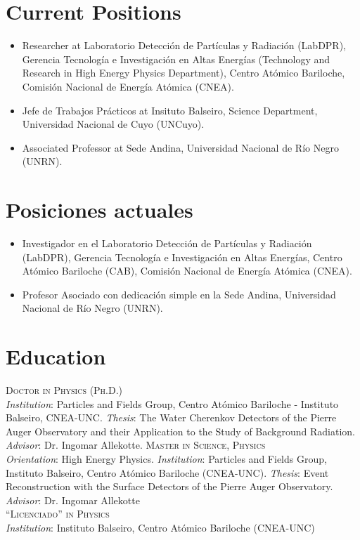 \ifeng
\section*{Current Positions}
\begin{itemize}
  \item Researcher at Laboratorio Detección de Partículas y Radiación (LabDPR), Gerencia Tecnología e Investigación en Altas Energías (Technology and Research in High Energy Physics Department), Centro Atómico Bariloche, Comisión Nacional de Energía Atómica (CNEA).
  \item Jefe de Trabajos Prácticos at Insituto Balseiro, Science Department, Universidad Nacional de Cuyo (UNCuyo).
  \item Associated Professor at Sede Andina, Universidad Nacional de Río Negro (UNRN).
\end{itemize}
\else
\section*{Posiciones actuales}
\begin{itemize}
\item Investigador en el Laboratorio Detección de Partículas y Radiación (LabDPR), Gerencia Tecnología e Investigación en Altas Energías, Centro Atómico Bariloche (CAB), Comisión Nacional de Energía Atómica (CNEA).
\item Profesor Asociado con dedicación simple en la Sede Andina, Universidad Nacional de Río Negro (UNRN).
\end{itemize}
\fi

\ifeng
\section*{Education}
\noindent
{}\textsc{Doctor in Physics (Ph.D.)}\\
{\emph{Institution}}: Particles and Fields Group, Centro Atómico Bariloche - Instituto Balseiro, CNEA-UNC. {\emph{Thesis}}: The Water Cherenkov Detectors of the Pierre Auger Observatory and their Application to the Study of Background Radiation. {\emph{Advisor}}: Dr. Ingomar Allekotte.
\textsc{Master in Science, Physics}\\
{\emph{Orientation}}: High Energy Physics. {\emph{Institution}}: Particles and Fields Group, Instituto Balseiro, Centro Atómico Bariloche (CNEA-UNC). {\emph{Thesis}}: Event Reconstruction with the Surface Detectors of the Pierre Auger Observatory. {\emph{Advisor}}: Dr. Ingomar Allekotte\\
\textsc{``Licenciado'' in Physics}\\
{\emph{Institution}}: Instituto Balseiro, Centro Atómico Bariloche (CNEA-UNC)\\
\else
